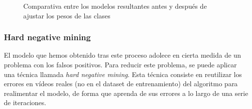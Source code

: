\begin{figure}\centering
  \par
  \hfill
  \caption{Comparativa entre los modelos resultantes antes y después de ajustar los pesos de las clases}
  \label{fig:vidcw}
\end{figure}

\subsubsection*{Hard negative mining}

El modelo que hemos obtenido tras este proceso adolece en cierta medida de un problema con los falsos positivos. Para reducir este problema, se puede aplicar una técnica llamada \textit{hard negative mining}. Esta técnica consiste en reutilizar los errores en vídeos reales (no en el dataset de entrenamiento) del algoritmo para realimentar el modelo, de forma que aprenda de sus errores a lo largo de una serie de iteraciones.

